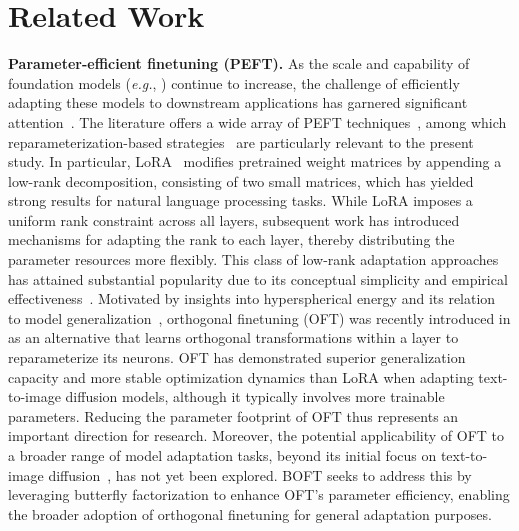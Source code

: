 \section{Related Work}

\textbf{Parameter-efficient finetuning (PEFT).} As the scale and capability of foundation models (\emph{e.g.}, \cite{brown2020language,radford2021learning,rombach2022high,kirillov2023segment}) continue to increase, the challenge of efficiently adapting these models to downstream applications has garnered significant attention~\cite{treviso2023efficient,ding2023parameter,lialin2023scaling}. The literature offers a wide array of PEFT techniques~\cite{houlsby2019parameter,aghajanyan2020intrinsic,hulora2022,edalati2022krona,wang2022adamix,gheini2021cross,zaken2022bitfit,guo2020parameter,sung2021training,ansell2022composable,lester2021power,li2021prefix,vu2022spot,he2021towards,mao2021unipelt,karimi2021compacter,liu2022few,sung2022lst,chen2022parameter,jia2022visual,chen2022adaptformer,zhang2022neural,jie2023fact,lian2022scaling,luo2023towards}, among which reparameterization-based strategies~\cite{aghajanyan2020intrinsic,hulora2022,edalati2022krona} are particularly relevant to the present study. In particular, LoRA~\cite{hulora2022} modifies pretrained weight matrices by appending a low-rank decomposition, consisting of two small matrices, which has yielded strong results for natural language processing tasks. While LoRA imposes a uniform rank constraint across all layers, subsequent work \cite{zhang2022adaptive,valipour2022dylora,zhang2023increlora} has introduced mechanisms for adapting the rank to each layer, thereby distributing the parameter resources more flexibly. This class of low-rank adaptation approaches has attained substantial popularity due to its conceptual simplicity and empirical effectiveness~\cite{dettmers2023qlora,zi2023delta,chavan2023one}. Motivated by insights into hyperspherical energy and its relation to model generalization~\cite{liu2018learning,liu2021orthogonal}, orthogonal finetuning (OFT) was recently introduced in \cite{qiu2023controlling} as an alternative that learns orthogonal transformations within a layer to reparameterize its neurons. OFT has demonstrated superior generalization capacity and more stable optimization dynamics than LoRA when adapting text-to-image diffusion models, although it typically involves more trainable parameters. Reducing the parameter footprint of OFT thus represents an important direction for research. Moreover, the potential applicability of OFT to a broader range of model adaptation tasks, beyond its initial focus on text-to-image diffusion~\cite{qiu2023controlling}, has not yet been explored. BOFT seeks to address this by leveraging butterfly factorization to enhance OFT's parameter efficiency, enabling the broader adoption of orthogonal finetuning for general adaptation purposes.

